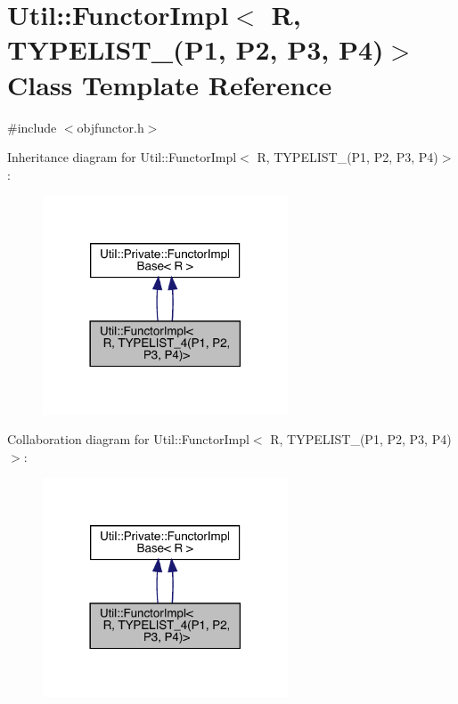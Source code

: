 \hypertarget{classUtil_1_1FunctorImpl_3_01R_00_01TYPELIST__4_07P1_00_01P2_00_01P3_00_01P4_08_4}{}\section{Util\+:\+:Functor\+Impl$<$ R, T\+Y\+P\+E\+L\+I\+S\+T\+\_(P1, P2, P3, P4)$>$ Class Template Reference}
\label{classUtil_1_1FunctorImpl_3_01R_00_01TYPELIST__4_07P1_00_01P2_00_01P3_00_01P4_08_4}


{\ttfamily \#include $<$objfunctor.\+h$>$}



Inheritance diagram for Util\+:\+:Functor\+Impl$<$ R, T\+Y\+P\+E\+L\+I\+S\+T\+\_(P1, P2, P3, P4)$>$\+:\nopagebreak
\begin{figure}[H]
\begin{center}
\leavevmode
\includegraphics[width=206pt]{d2/d4d/classUtil_1_1FunctorImpl_3_01R_00_01TYPELIST__4_07P1_00_01P2_00_01P3_00_01P4_08_4__inherit__graph}
\end{center}
\end{figure}


Collaboration diagram for Util\+:\+:Functor\+Impl$<$ R, T\+Y\+P\+E\+L\+I\+S\+T\+\_(P1, P2, P3, P4)$>$\+:\nopagebreak
\begin{figure}[H]
\begin{center}
\leavevmode
\includegraphics[width=206pt]{de/d13/classUtil_1_1FunctorImpl_3_01R_00_01TYPELIST__4_07P1_00_01P2_00_01P3_00_01P4_08_4__coll__graph}
\end{center}
\end{figure}
